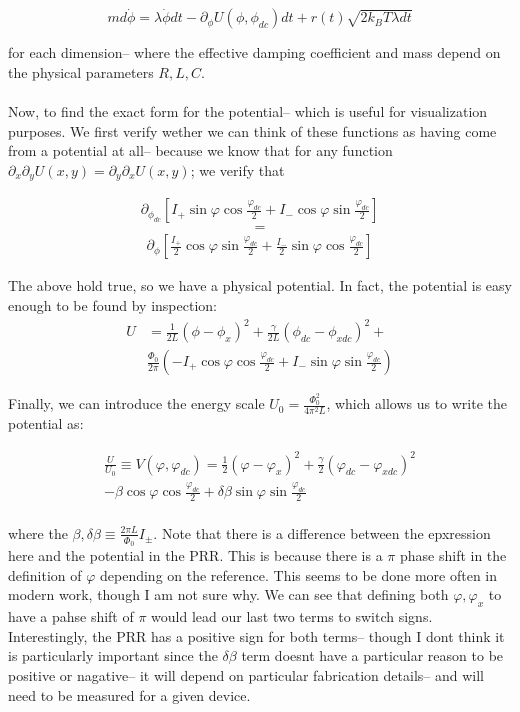 \documentclass[paper=a4, twocolumn, fontsize=10pt]{article} %
\numberwithin{equation}{section} %
\numberwithin{figure}{section} %
\numberwithin{table}{section} %
\begin{document}
\[ m d \dot{\phi} = \lambda \dot{\phi} dt - \partial_\phi U(\phi, \phi_{dc}) dt + r(t) \sqrt{2 k_B T \lambda dt} \]

for each dimension-- where the effective damping coefficient and mass depend on the physical parameters $R,L,C$.
\\
\\
Now, to find the exact form for the potential-- which is useful for visualization purposes. We first verify wether we can think of these functions as having come from a potential at all-- because we know that for any function $\partial_{x} \partial_{y} U(x,y) = \partial_{y} \partial_{x} U(x,y)$; we verify that

\begin{align}
 \partial_{\phi_{dc}}\left[I_{+} \sin \varphi \cos \frac{\varphi_{dc}}{2} + I_{-} \cos \varphi \sin \frac{\varphi_{dc}}{2}\right]
\end{align}
\[=\]
\begin{align} 
    \partial_{\phi}\left[\frac{I_{+}}{2} \cos \varphi \sin \frac{\varphi_{dc}}{2} + \frac{I_{-}}{2} \sin \varphi \cos \frac{\varphi_{dc}}{2}\right]
\end{align}

The above hold true, so we have a physical potential. In fact, the potential is easy enough to be found by inspection: 
\begin{align}
U &= \frac{1}{2L} (\phi-\phi_x)^2 + \frac{\gamma}{2L} (\phi_{dc}-\phi_{xdc})^2 + \\
 &\frac{\Phi_0}{2\pi}  \left( - I_+ \cos \varphi \cos \frac{\varphi_{dc}}{2} + I_- \sin \varphi \sin \frac{\varphi_{dc}}{2}\right)
\end{align}

Finally, we can introduce the energy scale $U_0 = \frac{ \Phi_0^2}{4\pi^2 L} $, which allows us to write the potential as:

\begin{align}
    \frac{U}{U_0} \equiv V(\varphi, \varphi_{dc}) =  \frac{1}{2} (\varphi-\varphi_x)^2 + \frac{\gamma}{2} (\varphi_{dc}-\varphi_{xdc})^2
    \\
     - \beta \cos \varphi \cos \frac{\varphi_{dc}}{2} + \delta\beta \sin \varphi \sin \frac{\varphi_{dc}}{2}
    \\
\end{align}

where the $\beta,\delta\beta \equiv \frac{2\pi L}{\Phi_0} I_{\pm}$. Note that there is a difference between the epxression here and the potential in the PRR. This is because there is a $\pi$ phase shift in the definition of $\varphi$ depending on the reference. This seems to be done more often in modern work, though I am not sure why. We can see that defining both $\varphi,\varphi_{x}$ to have a pahse shift of $\pi$ would lead our last two terms to switch signs. Interestingly, the PRR has a positive sign for both terms-- though I dont think it is particularly important since the $\delta\beta$ term doesnt have a particular reason to be positive or nagative-- it will depend on particular fabrication details-- and will need to be measured for a given device.
\end{document}
